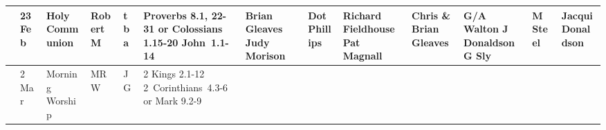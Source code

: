 \documentclass[10pt,a4paper]{article}
\begin{document}
\begin{landscape}
\begin{center}
{\begin{tabular}{|l|p{2cm}|p{1.4cm}|p{1.0cm}|p{0.8cm}|p{3.4cm}|p{2cm}|p{1.5cm}|p{2cm}|p{2cm}|p{1.9cm}
|p{2cm}|p{1.8cm}|}
& 23 Feb & Holy Communion & Robert M & tba &
Proverbs 8.1, 22-31 or 
Colossians 1.15-20 
\mbox{John 1.1-14}

& Brian Gleaves Judy Morison  & Dot Phillips & Richard Fieldhouse  Pat Magnall & 
Chris \& Brian Gleaves  & 
G/A Walton  \linebreak J Donaldson  \linebreak G Sly
&  M Steel & Jacqui Donaldson \\
\hline %
& 2 Mar  & Morning Worship
 & MRW & JG & 
2 Kings 2.1-12 
\mbox{2 Corinthians 4.3-6} or
Mark 9.2-9 


\end{tabular}}
\end{center}
\end{landscape}
\end{document}
